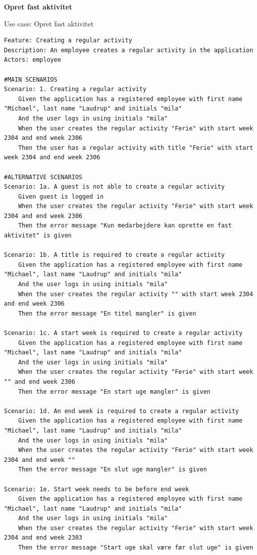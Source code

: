 \textbf{Opret fast aktivitet}
\begin{listing}[H]
    \centering
    \caption{Use case: Opret fast aktivitet}\label{lst:usecase_regular_activity}
    \begin{verbatim}  
Feature: Creating a regular activity
Description: An employee creates a regular activity in the application
Actors: employee

#MAIN SCENARIOS
Scenario: 1. Creating a regular activity
    Given the application has a registered employee with first name "Michael", last name "Laudrup" and initials "mila"
    And the user logs in using initials "mila" 
    When the user creates the regular activity "Ferie" with start week 2304 and end week 2306
    Then the user has a regular activity with title "Ferie" with start week 2304 and end week 2306

#ALTERNATIVE SCENARIOS
Scenario: 1a. A guest is not able to create a regular activity
    Given guest is logged in
    When the user creates the regular activity "Ferie" with start week 2304 and end week 2306
    Then the error message "Kun medarbejdere kan oprette en fast aktivitet" is given

Scenario: 1b. A title is required to create a regular activity
    Given the application has a registered employee with first name "Michael", last name "Laudrup" and initials "mila"
    And the user logs in using initials "mila"
    When the user creates the regular activity "" with start week 2304 and end week 2306
    Then the error message "En titel mangler" is given

Scenario: 1c. A start week is required to create a regular activity
    Given the application has a registered employee with first name "Michael", last name "Laudrup" and initials "mila"
    And the user logs in using initials "mila"
    When the user creates the regular activity "Ferie" with start week "" and end week 2306
    Then the error message "En start uge mangler" is given

Scenario: 1d. An end week is required to create a regular activity
    Given the application has a registered employee with first name "Michael", last name "Laudrup" and initials "mila"
    And the user logs in using initials "mila"
    When the user creates the regular activity "Ferie" with start week 2304 and end week ""
    Then the error message "En slut uge mangler" is given

Scenario: 1e. Start week needs to be before end week
    Given the application has a registered employee with first name "Michael", last name "Laudrup" and initials "mila"
    And the user logs in using initials "mila"
    When the user creates the regular activity "Ferie" with start week 2304 and end week 2303
    Then the error message "Start uge skal være før slut uge" is given


\end{verbatim}
\end{listing}
